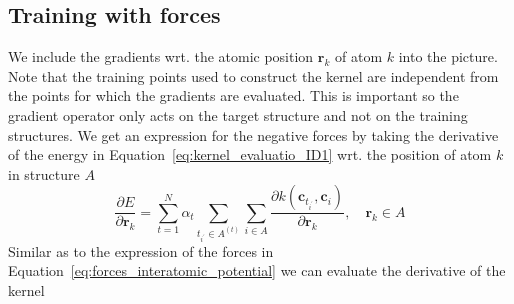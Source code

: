 \subsection{Training with forces}
We include the gradients wrt. the atomic position $\mathbf{r}_k$ of atom $k$ into the picture.
Note that the training points used to construct the kernel are independent from the points for which the gradients are evaluated.
This is important so the gradient operator only acts on the target structure and not on the training structures.
We get an expression for the negative forces by taking the derivative of the energy in Equation~\eqref{eq:kernel_evaluatio_ID1} wrt. the position of atom $k$ in structure $A$
\begin{equation}
  \label{eq:kernel_evaluation_gradients}
  \frac{\partial E}{\partial\mathbf{r}_k} = \sum_{t=1}^N \alpha_t \sum_{t_{i^\prime}\in A^{(t)}}\sum_{i\in A} \frac{\partial k(\mathbf{c}_{t_{i^\prime}}, \mathbf{c}_{i})}{\partial\mathbf{r}_k},\quad\mathbf{r}_k\in A
\end{equation}
Similar as to the expression of the forces in Equation~\eqref{eq:forces_interatomic_potential} we can evaluate the derivative of the kernel
